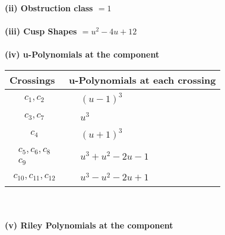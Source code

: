 \documentclass[1p]{elsarticle_modified}
\theoremstyle{definition}
\begin{document}
\flushleft \textbf{(ii) Obstruction class $= 1$}\\~\\
\flushleft \textbf{(iii) Cusp Shapes $= u^2-4 u+12$}\\~\\
\newpage\renewcommand{\arraystretch}{1}
\flushleft \textbf{(iv) u-Polynomials at the component}\newline \\
\begin{tabular}{m{50pt}|m{274pt}}
Crossings & \hspace{64pt}u-Polynomials at each crossing \\
\hline $$\begin{aligned}c_{1},c_{2}\end{aligned}$$&$\begin{aligned}
&(u-1)^3
\end{aligned}$\\
\hline $$\begin{aligned}c_{3},c_{7}\end{aligned}$$&$\begin{aligned}
&u^3
\end{aligned}$\\
\hline $$\begin{aligned}c_{4}\end{aligned}$$&$\begin{aligned}
&(u+1)^3
\end{aligned}$\\
\hline $$\begin{aligned}c_{5},c_{6},c_{8}\\c_{9}\end{aligned}$$&$\begin{aligned}
&u^3+u^2-2 u-1
\end{aligned}$\\
\hline $$\begin{aligned}c_{10},c_{11},c_{12}\end{aligned}$$&$\begin{aligned}
&u^3- u^2-2 u+1
\end{aligned}$\\
\hline
\end{tabular}\\~\\
\newpage\renewcommand{\arraystretch}{1}
\flushleft \textbf{(v) Riley Polynomials at the component}\newline \\
\end{document}
